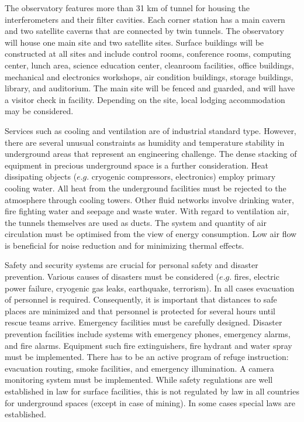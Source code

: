 The observatory features more than 31 km of tunnel for housing the interferometers and their filter cavities. Each corner station has a main cavern and two satellite caverns that are connected by twin tunnels. The observatory will house one main site and two satellite sites. Surface buildings will be constructed at all sites and include control rooms, conference rooms, computing center, lunch area, science education center, cleanroom facilities, office buildings, mechanical and electronics workshops, air condition buildings, storage buildings, library, and auditorium. The main site will be fenced and guarded, and will have a visitor check in facility. Depending on the site, local lodging accommodation may be considered.

Services such as cooling and ventilation are of industrial standard type. However, there are several unusual constraints as humidity and temperature stability in underground areas that represent an engineering challenge. The dense stacking of equipment in precious underground space is a further consideration. Heat dissipating objects ($e.g.$ cryogenic compressors, electronics) employ primary cooling water. All heat from the underground facilities must be rejected to the atmosphere through cooling towers. Other fluid networks involve drinking water, fire fighting water and seepage and waste water. With regard to ventilation air, the tunnels themselves are used as ducts. The system and quantity of air circulation must be optimised from the view of energy consumption. Low air flow is beneficial for noise reduction and for minimizing thermal effects. 

Safety and security systems are crucial for personal safety and disaster prevention. Various causes of disasters must be considered ($e.g.$ fires, electric power failure, cryogenic gas leaks, earthquake, terrorism). In all cases evacuation of personnel is required. Consequently, it is important that distances to safe places are minimized and that personnel is protected for several hours until rescue teams arrive. Emergency facilities must be carefully designed. Disaster prevention facilities include systems with emergency phones, emergency alarms, and fire alarms. Equipment such fire extinguishers, fire hydrant and water spray must be implemented. There has to be an active program of refuge instruction: evacuation routing, smoke facilities, and emergency illumination. A camera monitoring system must be implemented. While safety regulations are well established in law for surface facilities, this is not regulated by law in all countries for underground spaces (except in case of mining). In some cases special laws are established.

